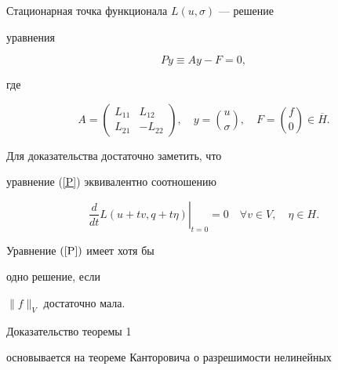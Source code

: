 \begin{lem} 


\label{initsysts}


Стационарная точка функционала $L(u, \sigma)$ --- решение


ура\-в\-не\-ния


\begin{equation}


\label{P}


Py \equiv Ay -F = 0,


\end{equation}


где


$$


A =


\begin{pmatrix}


L_{11}& L_{12}\\


L_{21}& -L_{22}


\end{pmatrix}, \quad


y = \binom {u}{\sigma }, \quad


F = \binom {f} {0} \in \overline H. 


$$


\end{lem} 





Для доказательства достаточно заметить, что 


уравнение (\ref{P}) эк\-ви\-ва\-лен\-т\-но соотношению


$$


\left . \frac {d}{dt} L(u + tv, q + t \eta ) \right |_{t=0} = 0 \quad


\forall v \in V,\quad \eta \in H.


$$


\begin{thm}


Уравнение $(\ref{P})$ имеет хотя бы 


одно решение, если 


$\| f \|_V $ достаточно мала.


\end{thm} 





Доказательство теоремы 1


основывается на теореме Канторовича о разрешимости нелинейных 


